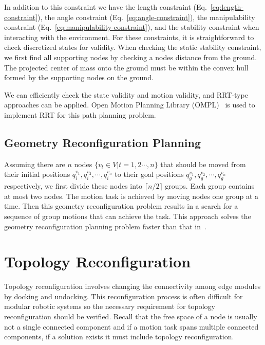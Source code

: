\documentclass[journal]{IEEEtran}
\begin{document}
In addition to this constraint we have the length constraint
(Eq.~\ref{eq:length-constraint}), the angle constraint
(Eq.~\ref{eq:angle-constraint}), the manipulability constraint
(Eq.~\ref{eq:manipulability-constraint}), and the stability constraint
when interacting with the environment. For these constraints, it is
straightforward to check discretized states for validity. When
checking the static stability constraint, we first find all supporting
nodes by checking a nodes distance from the ground. The projected
center of mass onto the ground must be within the convex hull formed
by the supporting nodes on the ground.

We can efficiently check the state validity and motion validity, and
RRT-type approaches can be applied. Open Motion Planning Library
(OMPL)~\cite{Sucan-ompl-ram-2012} is used to implement RRT for this
path planning problem.


\subsection{Geometry Reconfiguration Planning}
\label{sec:shape}

Assuming there are $n$ nodes $\{v_t\in V\vert t=1,2\cdots,n\}$ that
should be moved from their initial positions
$q_i^{v_1}, q_i^{v_2}, \cdots, q_i^{v_n}$ to their goal positions
$q_g^{v_1}, q_g^{v_2}, \cdots, q_g^{v_n}$ respectively, we first
divide these nodes into $\lceil n /2\rceil$ groups. Each group
contains at most two nodes. The motion task is achieved by moving
nodes one group at a time. Then this geometry reconfiguration problem
results in a search for a sequence of group motions that can achieve
the task. This approach solves the geometry reconfiguration planning
problem faster than that in~\cite{Liu-vtt-cspace-icra-2020}.

\section{Topology Reconfiguration}
\label{sec:topology}

Topology reconfiguration involves changing the connectivity among edge
modules by docking and undocking. This reconfiguration process is
often difficult for modular robotic systems so the necessary
requirement for topology reconfiguration should be verified. Recall
that the free space of a node is usually not a single connected
component and if a motion task spans multiple connected components, if
a solution exists it must include topology reconfiguration.
\end{document}
